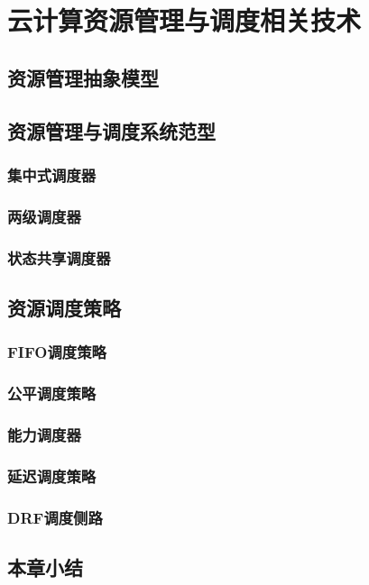 \chapter{云计算资源管理与调度相关技术}
\label{chap:outline}

\section{资源管理抽象模型}
\section{资源管理与调度系统范型}
\subsection{集中式调度器}
\subsection{两级调度器}
\subsection{状态共享调度器}
\section{资源调度策略}
\subsection{FIFO调度策略}
\subsection{公平调度策略}
\subsection{能力调度器}
\subsection{延迟调度策略}
\subsection{DRF调度侧路}
\section{本章小结}
